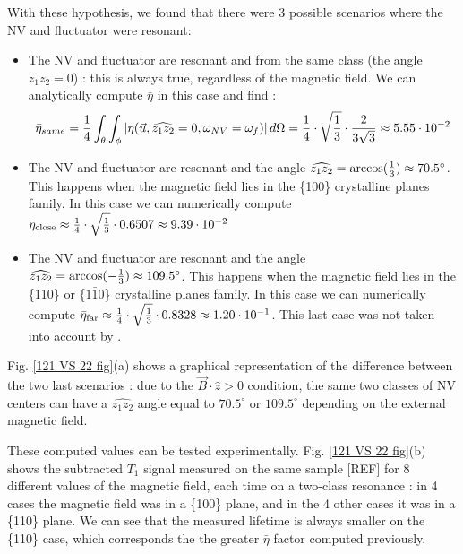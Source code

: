 \documentclass[preprintnumbers,amsmath,amssymb,onecolumn,12pt]{revtex4-2}
\begin{document}
With these hypothesis, we found that there were 3 possible scenarios where the NV and fluctuator were resonant:
\begin{itemize}
\item The NV and fluctuator are resonant and from the same class (the angle $\widehat{z_1 z_2}=0$) : this is always true, regardless of the magnetic field. We can analytically compute $\bar \eta$ in this case and find : $$ \bar {\eta}_{same}=\frac{1}{4}  \int_\theta \int_\phi \abs{\eta(\vec u,\widehat{z_1 z_2}=0,\omega_{NV}=\omega_f)}\, d\Omega= \frac{1}{4} \cdot \sqrt{\frac{1}{3}} \cdot \frac{2}{3 \sqrt{3}} \approx 5.55\cdot10^{-2}$$
\item The NV and fluctuator are resonant and the angle $\widehat{z_1 z_2}=\rm{arccos}(\frac{1}{3})\approx 70.5^\circ$. This happens when the magnetic field lies in the \{100\} crystalline planes family. In this case we can numerically compute $\bar \eta_{\rm close} \approx \frac{1}{4} \cdot \sqrt{\frac{1}{3}} \cdot 0.6507 \approx 9.39\cdot10^{-2}$
\item The NV and fluctuator are resonant and the angle $\widehat{z_1 z_2}=\rm{arccos}(-\frac{1}{3})\approx 109.5^\circ$. This happens when the magnetic field lies in the \{110\} or \{$1\bar{1}0$\} crystalline planes family. In this case we can numerically compute $\bar \eta_{\rm far} \approx \frac{1}{4} \cdot \sqrt{\frac{1}{3}} \cdot 0.8328 \approx 1.20\cdot10^{-1}$. This last case was not taken into account by \cite{choi_depolarization_2017}.
\end{itemize}



Fig. \ref{121 VS 22 fig}(a) shows a graphical representation of the difference between the two last scenarios : due to the $\vec{B}\cdot \hat{z} >0$ condition, the same two classes of NV centers can have a $\widehat{z_1 z_2}$ angle equal to $70.5^\circ$ or $109.5^\circ$ depending on the external magnetic field. 

These computed values can be tested experimentally. Fig. \ref{121 VS 22 fig}(b) shows the subtracted $T_1$ signal measured on the same sample [REF] for 8 different values of the magnetic field, each time on a two-class resonance : in 4 cases the magnetic field was in a \{100\} plane, and in the 4 other cases it was in a \{110\} plane. We can see that the measured lifetime is always smaller on the \{110\} case, which corresponds the the greater $\bar \eta$ factor computed previously.
\end{document}
